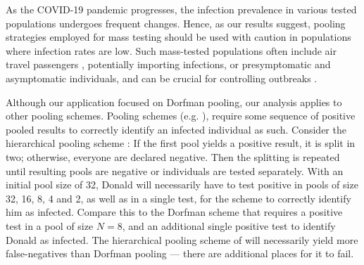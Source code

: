 \documentclass{article}
\begin{document}

As the COVID-19 pandemic progresses, the infection prevalence
in various tested populations undergoes frequent changes. Hence, as
our results suggest, pooling strategies employed for mass testing should be
used with caution in populations where infection rates are low. Such
mass-tested populations often include air travel passengers
\cite{JTM,RobinHood}, potentially importing infections, or
presymptomatic and asymptomatic individuals, and can be crucial for
controlling outbreaks \cite{MinaScience}.


Although our application focused on Dorfman pooling, our analysis
applies to other pooling schemes. Pooling schemes
(e.g. \cite{MatrixPooling,Lion, Kim}), require some sequence of
positive pooled results to correctly identify an infected individual as
such. Consider the hierarchical pooling scheme \cite{Lion, Kim}:
If the first pool yields a positive result, it is split in two;
otherwise, everyone are declared negative. Then the splitting is
repeated until resulting pools are negative or individuals are tested
separately. With an initial pool size of 32, Donald will necessarily
have to test positive in pools of size 32, 16, 8, 4 and 2, as well as
in a single test, for the scheme to correctly identify him as
infected. Compare this to the Dorfman scheme that requires a positive
test in a pool of size $N=8$, and an additional single positive test
to identify Donald as infected. The hierarchical pooling scheme of
\cite{Lion, Kim} will necessarily yield more false-negatives than
Dorfman pooling --- there are additional places for it to fail.
\end{document}
